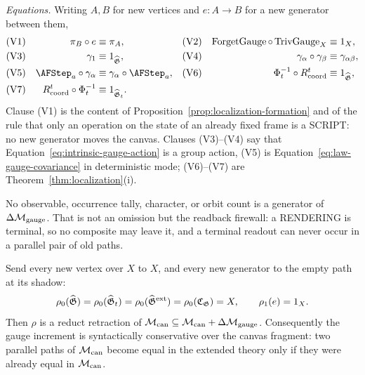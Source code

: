 \begin{definition}
\emph{Equations.}  Writing $A,B$ for new vertices and $e:A\to B$ for a new
generator between them,
\[
\begin{aligned}
 &\text{(V1)}&\pi_B\circ e&\equiv\pi_A,&
 &\text{(V2)}&\operatorname{ForgetGauge}\circ\operatorname{TrivGauge}_X
   &\equiv 1_X,\\
 &\text{(V3)}&\gamma_1&\equiv 1_{\widehat{\mathfrak G}},&
 &\text{(V4)}&\gamma_\alpha\circ\gamma_\beta&\equiv\gamma_{\alpha\beta},\\
 &\text{(V5)}&\AFStep_a\circ\gamma_\alpha&\equiv\gamma_\alpha\circ\AFStep_a,&
 &\text{(V6)}&\Phi_t^{-1}\circ R_{\rm coord}^t
   &\equiv 1_{\widehat{\mathfrak G}},\\
 &\text{(V7)}&R_{\rm coord}^t\circ\Phi_t^{-1}
   &\equiv 1_{\widehat{\mathfrak G}_t}.&&&&
\end{aligned}
\]
Clause (V1) is the content of
Proposition~\ref{prop:localization-formation} and of the rule that only an
operation on the state of an already fixed frame is a SCRIPT: no new generator
moves the canvas.  Clauses (V3)--(V4) say that
Equation~\eqref{eq:intrinsic-gauge-action} is a group action, (V5) is
Equation~\eqref{eq:law-gauge-covariance} in deterministic mode; (V6)--(V7) are
Theorem~\ref{thm:localization}\textup{(i)}.

No observable, occurrence tally, character, or orbit count is a generator of
$\Delta\mathcal M_{\rm gauge}$.  That is not an omission but the readback
firewall: a RENDERING is terminal, so no composite may leave it, and a
terminal readout can never occur in a parallel pair of old paths.
\end{definition}

\begin{proposition}
\label{prop:gauge-retraction}
Send every new vertex over $X$ to $X$, and every new generator to the empty
path at its shadow:
\[
 \rho_0(\widehat{\mathfrak G})
 =\rho_0(\widehat{\mathfrak G}_t)
 =\rho_0(\widehat{\mathfrak G}^{\rm ext})
 =\rho_0(\mathfrak C_{\mathfrak G})
 =X,
 \qquad
 \rho_1(e)=1_X .
\]
Then $\rho$ is a reduct retraction of
$\mathcal M_{\rm can}\subseteq\mathcal M_{\rm can}+\Delta\mathcal M_{\rm gauge}$.
Consequently the gauge increment is syntactically conservative over the canvas
fragment: two parallel paths of $\mathcal M_{\rm can}$ become equal in the
extended theory only if they were already equal in $\mathcal M_{\rm can}$.
\end{proposition}

